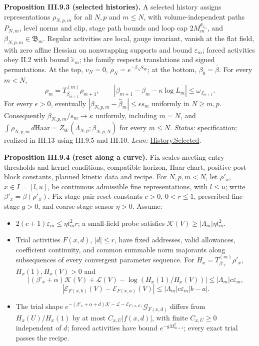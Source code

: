 \documentclass[
  letterpaper,
  11pt]{article}
\providecommand{\tightlist}{%
  \setlength{\itemsep}{0pt}\setlength{\parskip}{0pt}}
\begin{document}
\textbf{Proposition III.9.3 (selected histories).} A selected history
assigns representations \(\rho_{N,p,m}\) for all \(N,p\) and \(m\le N\),
with volume-independent paths \(P_{N,m}\), level norms and clip, stage
path bounds and loop cap \(2M_m^{\theta_{J_m}}\), and
\(\beta_{N,p,m}\in\mathfrak B_m\). Regular activities are local, gauge
invariant, vanish at the flat field, with zero affine Hessian on
nonwrapping supports and bound \(\varepsilon_m\); forced activities obey
II.2 with bound \(\tilde\varepsilon_m\); the family respects
translations and signed permutations. At the top, \(v_N=0\),
\(\rho_N=e^{-\beta_NS_W}\); at the bottom, \(\beta_0=\bar\beta\). For
every \(m<N\),
\[\rho_m=T^{(m)}_{\beta_{m+1}}\rho_{m+1},\qquad |\beta_{m+1}-\beta_m-\kappa\log L_m|\le\omega_{J_{m+1}}.\]
For every \(\epsilon>0\), eventually
\(|\beta_{N,p,m}-\hat\beta_m|\le\epsilon s_m\) uniformly in
\(N\ge m,p\). Consequently \(\beta_{N,p,m}/s_m\to\kappa\) uniformly,
including \(m=N\), and
\(\int\rho_{N,p,m}\,d\mathrm{Haar}=Z_W(\Lambda_{N,p};\beta_{N,p,N})\)
for every \(m\le N\). \emph{Status:} specification; realized in III.13
using III.9.5 and III.10. \emph{Lean:}
\href{https://github.com/yang-mills-group/OpenAI-YM-20261028/blob/3456e5e75cf8d4cd558955a5c7638fba2d68f464/YM/RG/History.lean\#L234-L240}{History.Selected}.

\textbf{Proposition III.9.4 (reset along a curve).} Fix scales meeting
entry thresholds and kernel conditions, compatible horizon, Haar chart,
positive post-block constants, planned kinetic data and recipe. For
\(N,p,m<N\), let \(\rho'_x\), \(x\in I=[l,u]\), be continuous admissible
fine representations, with \(l\le u\); write
\(\beta'_x=\beta(\rho'_x)\). Fix stage-pair reset constants \(c>0\),
\(0<r\le1\), prescribed fine-stage \(g>0\), and coarse-stage sensor
\(\eta>0\). Assume:

\begin{itemize}
\tightlist
\item
  \(2(c+1)\varepsilon_m\le\eta t_m^2r\); a small-field probe satisfies
  \(\mathcal K(V)\ge|\Lambda_m|\eta t_m^2\).
\item
  Trial activities \(F(x,d)\), \(|d|\le r\), have fixed addresses, valid
  allowances, coefficient continuity, and common summable norm majorants
  along subsequences of every convergent parameter sequence. For
  \(H_x=T^{(m)}_{\beta'_x}\rho'_x\), \(H_x(1),H_x(V)>0\) and
  \[| (\beta'_x+\alpha)\mathcal K(V)+\mathcal L(V)-\log(H_x(1)/H_x(V))|\le|\Lambda_m|c\varepsilon_m,\]
  \[|\mathcal E_{F(x,b)}(V)-\mathcal E_{F(x,a)}(V)|\le|\Lambda_m|c\varepsilon_m|b-a|.\]
\item
  The trial shape
  \(e^{-(\beta'_x+\alpha+d)\mathcal K-\mathcal L-\mathcal E_{F(x,d)}}\mathcal G_{F(x,d)}\)
  differs from \(H_x(U)/H_x(1)\) by at most \(C_{x,U}|f(x,d)|\), with
  finite \(C_{x,U}\ge0\) independent of \(d\); forced activities have
  bound \(e^{-gM_{m+1}^2}\); every exact trial passes the recipe.
\end{itemize}
\end{document}
